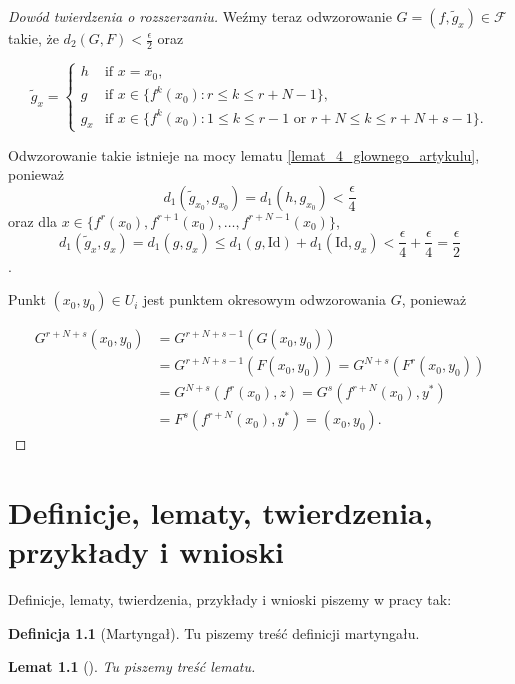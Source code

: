 \documentclass[licencjacka]{pwr_wmat_praca_dyplomowa}
\theoremstyle{plain}
\numberwithin{theorem}{chapter}
\newtheorem{lemma}[theorem]{Lemat}
\theoremstyle{definition}
\numberwithin{theorem}{chapter}
\newtheorem{definition}[theorem]{Definicja}
\begin{document}
\begin{proof}[Dowód twierdzenia o rozszerzaniu]
Weźmy teraz odwzorowanie $G = (f, \widetilde{g}_x) \in \mathcal{F}$ takie, że $d_2(G, F) < \frac{\epsilon}{2}$ oraz

\[
    \widetilde{g}_x =
    \begin{cases}
        h & \text{if $x=x_0$,}\\
        g & \text{if $x \in \{f^k(x_0) : r \leq k \leq r+N-1\}$,}\\
        g_x & \text{if $x \in \{f^k(x_0) : 1 \leq k \leq r-1$ or $r+N \leq k \leq r+N+s-1\}$.}
    \end{cases}
\]

Odwzorowanie takie istnieje na mocy lematu \ref{lemat_4_glownego_artykulu}, ponieważ
$$d_1(\widetilde{g}_{x_0}, g_{x_0}) = d_1(h, g_{x_0}) < \frac{\epsilon}{4}$$
oraz dla $x \in \{f^r(x_0), f^{r+1}(x_0), \ldots, f^{r+N-1}(x_0)\}$,
$$d_1(\widetilde{g}_x, g_x) = d_1(g, g_x) \leq d_1(g, \mathrm{Id}) + d_1(\mathrm{Id}, g_x) < \frac{\epsilon}{4} + \frac{\epsilon}{4} = \frac{\epsilon}{2}$$.

Punkt $(x_0, y_0) \in U_i$ jest punktem okresowym odwzorowania $G$, ponieważ

\begin{equation}
\begin{split}
G^{r+N+s}(x_0, y_0) & = G^{r+N+s-1}(G(x_0, y_0)) \\
& = G^{r+N+s-1}(F(x_0, y_0)) = G^{N+s}(F^r(x_0, y_0)) \\
& = G^{N+s}(f^r(x_0), z) = G^s(f^{r+N}(x_0), y^*) \\
& = F^s(f^{r+N}(x_0), y^*) = (x_0, y_0).
\end{split}
\end{equation}



\end{proof}





\chapter{Definicje, lematy, twierdzenia, przykłady i wnioski}
Definicje, lematy, twierdzenia, przykłady i wnioski piszemy w pracy tak:
\begin{definition}[Martyngał]
Tu piszemy treść definicji martyngału.
\end{definition}
\begin{lemma}[]%
Tu piszemy treść lematu.
\end{lemma}
\end{document}
